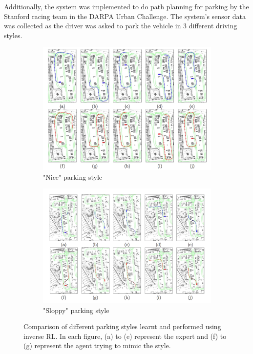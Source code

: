 \documentclass[hidelinks,BTech]{iitmdiss}
\begin{document}
Additionally, the system was implemented to do path planning for parking by the Stanford racing team in the DARPA Urban Challenge\cite{ApprenticeshipDARPA}. The system's sensor data was collected as the driver was asked to park the vehicle in 3 different driving styles.
\begin{figure}[H]
  \centering
  \begin{subfigure}[t]{0.48\textwidth}
    \centering
      \includegraphics[width=\textwidth]{IRL_nice.png}
      \caption{"Nice" parking style}
  \end{subfigure}
  \quad
  \begin{subfigure}[t]{0.48\textwidth}
    \centering
      \includegraphics[width=\textwidth]{IRL_sloppy.png}
      \caption{"Sloppy" parking style}
  \end{subfigure}
  \caption{Comparison of different parking styles learnt and performed using inverse RL. In each figure, (a) to (e) represent the expert and (f) to (g) represent the agent trying to mimic the style.}
\end{figure}
\end{document}
